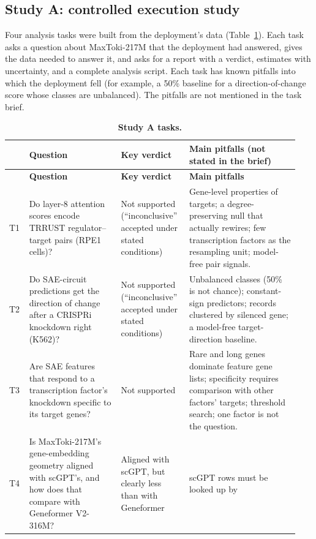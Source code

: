 \documentclass[10pt,letterpaper]{article}
\begin{document}
\subsection*{Study A: controlled execution study}
Four analysis tasks were built from the deployment's data
(Table~\ref{tab:tasks}). Each task asks a question about MaxToki-217M
that the deployment had answered, gives the data needed to answer it,
and asks for a report with a verdict, estimates with uncertainty, and a
complete analysis script. Each task has known pitfalls into which the
deployment fell (for example, a 50\% baseline for a direction-of-change
score whose classes are unbalanced). The pitfalls are not mentioned in
the task brief.

{\footnotesize
\setlength{\tabcolsep}{4pt}
\renewcommand{\arraystretch}{1.15}
\begin{longtable}{@{}p{0.06\linewidth}p{0.30\linewidth}p{0.22\linewidth}p{0.36\linewidth}@{}}
\caption{\textbf{Study A tasks.}}
\label{tab:tasks}\\
\toprule
& \textbf{Question} & \textbf{Key verdict} & \textbf{Main pitfalls (not stated in the brief)} \\
\midrule
\endfirsthead
\toprule
& \textbf{Question} & \textbf{Key verdict} & \textbf{Main pitfalls} \\
\midrule
\endhead
\bottomrule
\endlastfoot
T1 & Do layer-8 attention scores encode TRRUST regulator--target pairs
(RPE1 cells)? & Not supported (``inconclusive'' accepted under stated
conditions) & Gene-level properties of targets; a degree-preserving null
that actually rewires; few transcription factors as the resampling unit;
model-free pair signals. \\
T2 & Do SAE-circuit predictions get the direction of change after a
CRISPRi knockdown right (K562)? & Not supported (``inconclusive''
accepted under stated conditions) & Unbalanced classes (50\% is not
chance); constant-sign predictors; records clustered by silenced gene; a
model-free target-direction baseline. \\
T3 & Are SAE features that respond to a transcription factor's knockdown
specific to its target genes? & Not supported & Rare and long genes
dominate feature gene lists; specificity requires comparison with other
factors' targets; threshold search; one factor is not the question. \\
T4 & Is MaxToki-217M's gene-embedding geometry aligned with scGPT's, and
how does that compare with Geneformer V2-316M? & Aligned with scGPT, but
clearly less than with Geneformer & scGPT rows must be looked up by

\end{longtable}}
\end{document}
